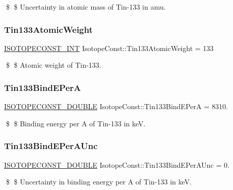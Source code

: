 \$ \$ Uncertainty in atomic mass of Tin-\/133 in amu. \mbox{\label{group___isotope_const-_tin-_sn133_ga26200d8927d62e36a33ebb3d18759a13}} 
\subsubsection{\texorpdfstring{Tin133\+Atomic\+Weight}{Tin133AtomicWeight}}
{\footnotesize\ttfamily \mbox{\hyperlink{group___isotope_const-_macros_ga5f18360b3e99483a35c32d789e62621c}{I\+S\+O\+T\+O\+P\+E\+C\+O\+N\+S\+T\+\_\+\+I\+NT}} Isotope\+Const\+::\+Tin133\+Atomic\+Weight = 133}

\$ \$ Atomic weight of Tin-\/133. \mbox{\label{group___isotope_const-_tin-_sn133_ga2ddbbd11bf4dd48500085d5de417b975}} 
\subsubsection{\texorpdfstring{Tin133\+Bind\+E\+PerA}{Tin133BindEPerA}}
{\footnotesize\ttfamily \mbox{\hyperlink{group___isotope_const-_macros_ga8f45a7272ce02c0b4c65c44636ed719a}{I\+S\+O\+T\+O\+P\+E\+C\+O\+N\+S\+T\+\_\+\+D\+O\+U\+B\+LE}} Isotope\+Const\+::\+Tin133\+Bind\+E\+PerA = 8310.}

\$ \$ Binding energy per A of Tin-\/133 in keV. \mbox{\label{group___isotope_const-_tin-_sn133_gab8c264066d9fa1fefca847a48c64cfc5}} 
\subsubsection{\texorpdfstring{Tin133\+Bind\+E\+Per\+A\+Unc}{Tin133BindEPerAUnc}}
{\footnotesize\ttfamily \mbox{\hyperlink{group___isotope_const-_macros_ga8f45a7272ce02c0b4c65c44636ed719a}{I\+S\+O\+T\+O\+P\+E\+C\+O\+N\+S\+T\+\_\+\+D\+O\+U\+B\+LE}} Isotope\+Const\+::\+Tin133\+Bind\+E\+Per\+A\+Unc = 0.}

\$ \$ Uncertainty in binding energy per A of Tin-\/133 in keV. \mbox{\label{group___isotope_const-_tin-_sn133_ga5b90bcb133ae6f0e67262c5a8ee25ad5}} 
